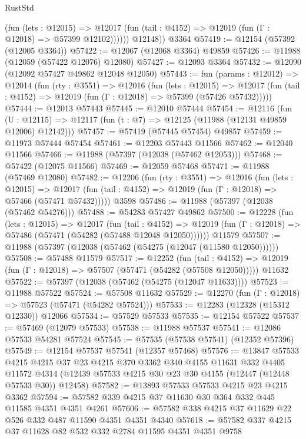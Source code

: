 \begin{lexlean}{RustStd}
\begin{coremodule}
              (fun (lets : @12015) =>
              @12017 (fun (tail : @4152) => @12019 (fun (Γ : @12018) => @57399 @12102))))))
        @12148))
    @3364
@57419 := @12154 (@57392 (@12005 @3364))
@57422 := @12067 (@12068 @3364) @49859
@57426 := @11988 (@12059 (@57422 @12076) @12080)
@57427 := @12093 @3364
@57432 := @12090 (@12092 @57427 @49862 @12048 @12050)
@57443 := fun (params : @12012) =>
  @12014
    (fun (rty : @3551) =>
    @12016
      (fun (lets : @12015) =>
      @12017 (fun (tail : @4152) => @12019 (fun (Γ : @12018) => @57399 (@57426 @57432)))))
@57444 := @12013 @57443
@57445 := @12010 @57444
@57454 := @12116
    (fun (U : @12115) => @12117 (fun (t : @7) => @12125 (@11988 (@12131 @49859 @12006) @12142)))
@57457 := @57419 (@57445 @57454) @49857
@57459 := @11973 @57444 @57454
@57461 := @12203 @57443 @11566
@57462 := @12040 @11566
@57466 := @11988 (@57397 (@12038 (@57462 @12053)))
@57468 := @57422 (@12075 @11566)
@57469 := @12059 @57468
@57471 := @11988 (@57469 @12080)
@57482 := @12206
    (fun (rty : @3551) =>
    @12016
      (fun (lets : @12015) =>
      @12017 (fun (tail : @4152) => @12019 (fun (Γ : @12018) => @57466 (@57471 @57432)))))
    @3598
@57486 := @11988 (@57397 (@12038 (@57462 @54276)))
@57488 := @54283 @57427 @49862
@57500 := @12228
    (fun (lets : @12015) =>
    @12017
      (fun (tail : @4152) =>
      @12019 (fun (Γ : @12018) => @57486 (@57471 (@54282 (@57488 @12048 @12050))))))
    @11579
@57507 := @11988 (@57397 (@12038 (@57462 (@54275 (@12047 (@11580 @12050))))))
@57508 := @57488 @11579
@57517 := @12252
    (fun (tail : @4152) => @12019 (fun (Γ : @12018) => @57507 (@57471 (@54282 (@57508 @12050)))))
    @11632
@57522 := @57397 (@12038 (@57462 (@54275 (@12047 @11633))))
@57523 := @11988 @57522
@57524 := @57508 @11632
@57529 := @12270 (fun (Γ : @12018) => @57523 (@57471 (@54282 @57524)))
@57533 := @12283 (@12328 (@15312 @12330)) @12066
@57534 := @57529 @57533
@57535 := @12154 @57522
@57537 := @57469 (@12079 @57533)
@57538 := @11988 @57537
@57541 := @12086 @57533 @54281 @57524
@57545 := @57535 (@57538 @57541) (@12352 @57396)
@57549 := @12154 @57537 @57541 (@12357 @57468)
@57576 := @13847
    @57533
    @4215
    @4215
    @37
    @23
    @4215
    @370
    @3362
    @340
    @4155
    @11631
    @332
    @4405
    @11572
    @4314
    (@12439 @57533 @4215 @30 @23 @30 @4155 (@12447 (@12448 @57533 @30)) @12458)
@57582 := @13893 @57533 @57533 @4215 @23 @4215 @3362
@57594 := @57582 @339 @4215 @37 @11630 @30 @364 @332 @445 @11585 @4351 @4351 @4261
@57606 := @57582 @338 @4215 @37 @11629 @22 @526 @332 @487 @11590 @4351 @4351 @4340
@57618 := @57582 @337 @4215 @37 @11628 @82 @532 @332 @2784 @11595 @4351 @4351 @9758

\end{coremodule}
\end{lexlean}
